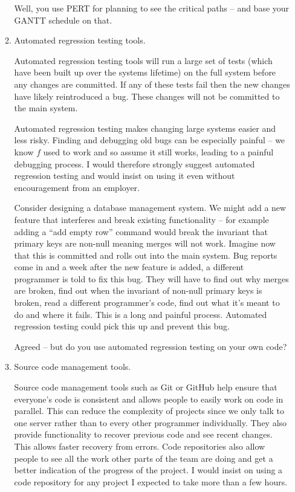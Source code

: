 \documentclass[10pt,\jkfside,a4paper]{article}
\begin{document}
\begin{enumerate}
\begin{enumerate}
{\color{blue}
Well, you use PERT for planning to see the critical paths -- and base your GANTT
schedule on that.
}

\item Automated regression testing tools.

Automated regression testing tools will run a large set of tests (which have
been built up over the systems lifetime) on the full system before any changes
are committed. If any of these tests fail then the new changes have likely
reintroduced a bug. These changes will not be committed to the main system.

Automated regression testing makes changing large systems easier and less
risky. Finding and debugging old bugs can be especially painful -- we know
$f$ used to work and so assume it still works, leading to a painful
debugging process. I would therefore strongly suggest automated regression
testing and would insist on using it even without encouragement from an
employer.

Consider designing a database management system. We might add a new feature
that interferes and break existing functionality -- for example adding a
``add empty row'' command would break the invariant that primary keys are
non-null meaning merges will not work. Imagine now that this is committed and
rolls out into the main system. Bug reports come in and a week after the new
feature is added, a different programmer is told to fix this bug. They will
have to find out why merges are broken, find out when the invariant of
non-null primary keys is broken, read a different programmer's code, find
out what it's meant to do and where it fails. This is a long and painful process.
Automated regression testing could pick this up and prevent this bug.

{\color{blue}
Agreed -- but do you use automated regression testing on your own code?
}

\item Source code management tools.

Source code management tools such as Git or GitHub help ensure that everyone's
code is consistent and allows people to easily work on code in parallel. This
can reduce the complexity of projects since we only talk to one server rather
than to every other programmer individually. They also provide functionality
to recover previous code and see recent changes. This allows faster recovery
from errors. Code repositories also allow people to see all the work other
parts of the team are doing and get a better indication of the progress of
the project. I would insist on using a code repository for any project I
expected to take more than a few hours.


\end{enumerate}
\end{enumerate}
\end{document}
